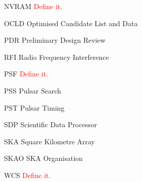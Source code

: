 \documentclass[11pt,a4paper]{article}
\begin{document}
\begin{basedescript}{\desclabelstyle{\pushlabel}\desclabelwidth{6em}}
    \item[NVRAM] \textcolor{red}{Define it.} \vspace{-0.2cm}
    \item[OCLD] Optimised Candidate List and Data \vspace{-0.2cm}
    \item[PDR] Preliminary Design Review\vspace{-0.2cm}
    \item[RFI] Radio Frequency Interference\vspace{-0.2cm}
    \item[PSF] \textcolor{red}{Define it.} \vspace{-0.2cm}
    \item[PSS] Pulsar Search\vspace{-0.2cm}
    \item[PST] Pulsar Timing\vspace{-0.2cm}
    \item[SDP] Scientific Data Processor\vspace{-0.2cm}
    \item[SKA] Square Kilometre Array\vspace{-0.2cm}
    \item[SKAO] SKA Organisation\vspace{-0.2cm}
    \item[WCS] \textcolor{red}{Define it.} \vspace{-0.2cm}
\end{basedescript} 

\newcommand{\nuno}{{\left(\frac{\nu}{\nu_0}\right)}}
\newcommand{\dnuno}{{\left(\frac{\nu-\nu_0}{\nu_0}\right)}}

\newcommand{\dg}{^\dag}
\newcommand{\X}{\vec{x}}
\newcommand{\Xd}{\vec{{x}^\dag}}
\newcommand{\B}{\vec{b}}
\newcommand{\Bd}{\vec{b^\dag}}
\newcommand{\A}{{\tens{A}}}
\newcommand{\Ad}{{\tens{A^\dag}}}
\newcommand{\F}{{\tens{F}}}
\newcommand{\Fd}{{\tens{F^\dag}}}
\newcommand{\He}{{\tens{H}}}
\newcommand{\Sa}{{\tens{S}{N}}}
\newcommand{\Sd}{{\tens{S^\dag}}}
\newcommand{\Sna}{\tens{{S_{\nu}}{N}}}
\newcommand{\Snd}{\tens{{S_{\nu}^\dag}}}
\newcommand{\T}{{\tens{T}}}
\newcommand{\W}{{\tens{W}}}
\newcommand{\Wd}{{\tens{W^\dag}}}
\newcommand{\Pb}{{P_b}}

\newcommand{\Wim}{{\tens{W^{im}}}}
\newcommand{\Wimd}{{\tens{{W^{im}}^\dag}}}
\newcommand{\Wnt}{{\tens{W^{mfs}_t}}}
\newcommand{\Wntd}{{\tens{{W^{mfs}_t}^\dag}}}
\newcommand{\Wnp}{{\tens{W^{mfs}_p}}}
\newcommand{\Wnpd}{{\tens{{W^{mfs}_p}^\dag}}}
\newcommand{\Wnq}{{\tens{W^{mfs}_q}}}
\newcommand{\Wnqd}{{\tens{{W^{mfs}_q}^\dag}}}
\newcommand{\Wimn}{{\tens{W^{im}_{\nu}}}}
\newcommand{\Wimnd}{{\tens{{W^{im}_{\nu}}^\dag}}}
\end{document}
